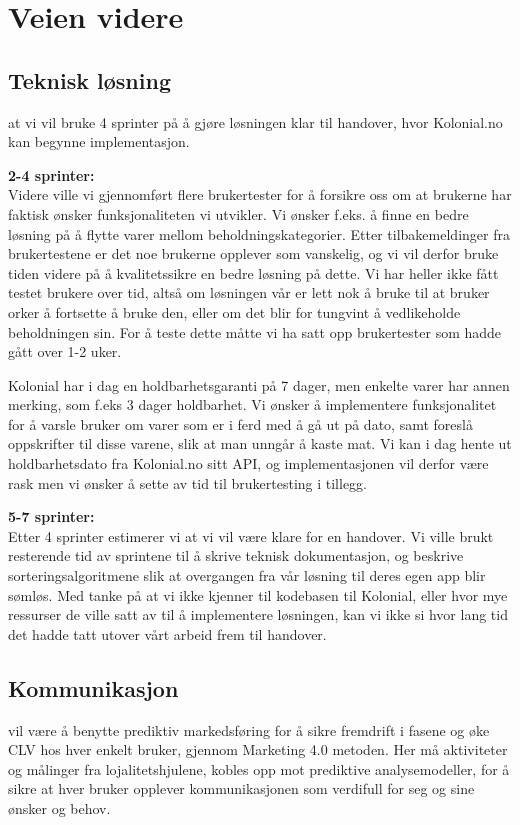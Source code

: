 \chapter{Veien videre}

\section{\textbf{Teknisk løsning}} 
 at vi vil bruke 4 sprinter på å gjøre løsningen klar til handover, hvor Kolonial.no kan begynne implementasjon.


\textbf{2-4 sprinter:}
\\Videre ville vi gjennomført flere brukertester for å forsikre oss om at brukerne har faktisk ønsker funksjonaliteten vi utvikler. Vi ønsker f.eks. å finne en bedre løsning på å flytte varer mellom beholdningskategorier. Etter tilbakemeldinger fra brukertestene er det noe brukerne opplever som vanskelig, og vi vil derfor bruke tiden videre på å kvalitetssikre en bedre løsning på dette. Vi har heller ikke fått testet brukere over tid, altså om løsningen vår er lett nok å bruke til at bruker orker å fortsette å bruke den, eller om det blir for tungvint å vedlikeholde beholdningen sin. For å teste dette måtte vi ha satt opp brukertester som hadde gått over 1-2 uker. 

Kolonial har i dag en holdbarhetsgaranti på 7 dager, men enkelte varer har annen merking, som f.eks 3 dager holdbarhet. Vi ønsker å implementere funksjonalitet for å varsle bruker om varer som er i ferd med å gå ut på dato, samt foreslå oppskrifter til disse varene, slik at man unngår å kaste mat. Vi kan i dag hente ut holdbarhetsdato fra Kolonial.no sitt API, og implementasjonen vil derfor være rask men vi ønsker å sette av tid til brukertesting i tillegg. 

\textbf{5-7 sprinter:}
\\Etter 4 sprinter estimerer vi at vi vil være klare for en handover. Vi ville brukt resterende tid av sprintene til å skrive teknisk dokumentasjon, og beskrive sorteringsalgoritmene slik at overgangen fra vår løsning til deres egen app blir sømløs. Med tanke på at vi ikke kjenner til kodebasen til Kolonial, eller hvor mye ressurser de ville satt av til å implementere løsningen, kan vi ikke si hvor lang tid det hadde tatt utover vårt arbeid frem til handover.

\section{\textbf{Kommunikasjon}}
 vil være å benytte prediktiv markedsføring for å sikre fremdrift i fasene og øke CLV hos hver enkelt bruker, gjennom Marketing 4.0 metoden. Her må aktiviteter og målinger fra lojalitetshjulene, kobles opp mot prediktive analysemodeller, for å sikre at hver bruker opplever kommunikasjonen som verdifull for seg og sine ønsker og behov. 

